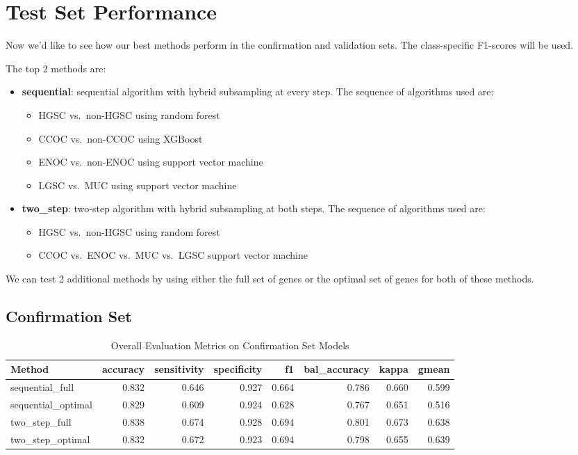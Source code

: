 \documentclass[
]{report}
\providecommand{\tightlist}{%
  \setlength{\itemsep}{0pt}\setlength{\parskip}{0pt}}
\begin{document}
\section{Test Set Performance}\label{test-set-performance}

Now we'd like to see how our best methods perform in the confirmation and validation sets. The class-specific F1-scores will be used.

The top 2 methods are:

\begin{itemize}
\tightlist
\item
  \textbf{sequential}: sequential algorithm with hybrid subsampling at every step. The sequence of algorithms used are:

  \begin{itemize}
  \tightlist
  \item
    HGSC vs.~non-HGSC using random forest
  \item
    CCOC vs.~non-CCOC using XGBoost
  \item
    ENOC vs.~non-ENOC using support vector machine
  \item
    LGSC vs.~MUC using support vector machine
  \end{itemize}
\item
  \textbf{two\_step}: two-step algorithm with hybrid subsampling at both steps. The sequence of algorithms used are:

  \begin{itemize}
  \tightlist
  \item
    HGSC vs.~non-HGSC using random forest
  \item
    CCOC vs.~ENOC vs.~MUC vs.~LGSC support vector machine
  \end{itemize}
\end{itemize}

We can test 2 additional methods by using either the full set of genes or the optimal set of genes for both of these methods.

\subsection{Confirmation Set}\label{confirmation-set}

\begin{table}

\caption{\label{tab:conf-eval-overall}Overall Evaluation Metrics on Confirmation Set Models}
\centering
\begin{tabular}[t]{l|r|r|r|r|r|r|r}
\hline
Method & accuracy & sensitivity & specificity & f1 & bal\_accuracy & kappa & gmean\\
\hline
sequential\_full & 0.832 & 0.646 & 0.927 & 0.664 & 0.786 & 0.660 & 0.599\\
\hline
sequential\_optimal & 0.829 & 0.609 & 0.924 & 0.628 & 0.767 & 0.651 & 0.516\\
\hline
two\_step\_full & 0.838 & 0.674 & 0.928 & 0.694 & 0.801 & 0.673 & 0.638\\
\hline
two\_step\_optimal & 0.832 & 0.672 & 0.923 & 0.694 & 0.798 & 0.655 & 0.639\\
\hline
\end{tabular}
\end{table}
\end{document}
